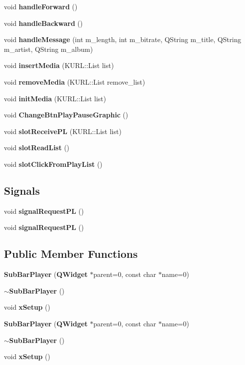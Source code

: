 \begin{CompactItemize}
\item 
void {\bf handle\-Forward} ()
\item 
void {\bf handle\-Backward} ()
\item 
void {\bf handle\-Message} (int m\_\-length, int m\_\-bitrate, QString m\_\-title, QString m\_\-artist, QString m\_\-album)
\item 
void {\bf insert\-Media} (KURL::List list)
\item 
void {\bf remove\-Media} (KURL::List remove\_\-list)
\item 
void {\bf init\-Media} (KURL::List list)
\item 
void {\bf Change\-Btn\-Play\-Pause\-Graphic} ()
\item 
void {\bf slot\-Receive\-PL} (KURL::List list)
\item 
void {\bf slot\-Read\-List} ()
\item 
void {\bf slot\-Click\-From\-Play\-List} ()
\end{CompactItemize}
\subsection*{Signals}
\begin{CompactItemize}
\item 
void {\bf signal\-Request\-PL} ()
\item 
void {\bf signal\-Request\-PL} ()
\end{CompactItemize}
\subsection*{Public Member Functions}
\begin{CompactItemize}
\item 
{\bf Sub\-Bar\-Player} ({\bf QWidget} $\ast$parent=0, const char $\ast$name=0)
\item 
{\bf $\sim$Sub\-Bar\-Player} ()
\item 
void {\bf x\-Setup} ()
\item 
{\bf Sub\-Bar\-Player} ({\bf QWidget} $\ast$parent=0, const char $\ast$name=0)
\item 
{\bf $\sim$Sub\-Bar\-Player} ()
\item 
void {\bf x\-Setup} ()
\end{CompactItemize}
